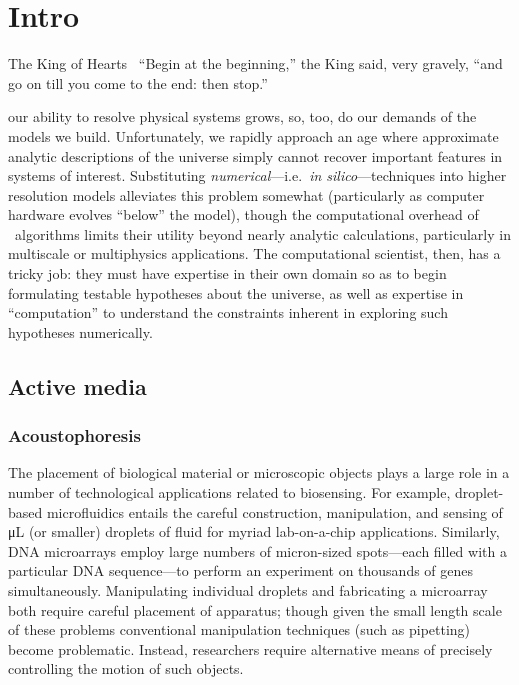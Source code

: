 \chapter{\label{ch:intro}Intro}

\begin{frontquote}{The King of Hearts~\cite{wonderland}}
``Begin at the beginning,'' the King said, very gravely, ``and go on till you come to the end: then stop.''
\end{frontquote}

 our ability to resolve physical systems grows, so, too, do our demands of the models we build.
Unfortunately, we rapidly approach an age where approximate analytic descriptions of the universe simply cannot recover important features in systems of interest.
Substituting \emph{numerical}---i.e.\ \emph{in silico}---techniques into higher resolution models alleviates this problem somewhat (particularly as computer hardware evolves ``below'' the model), though the computational overhead of \naive\ algorithms limits their utility beyond nearly analytic calculations, particularly in multiscale or multiphysics applications.
The computational scientist, then, has a tricky job: they must have expertise in their own domain so as to begin formulating testable hypotheses about the universe, as well as expertise in ``computation'' to understand the constraints inherent in exploring such hypotheses numerically.

\section{Active media}

\subsection{Acoustophoresis}

The placement of biological material or microscopic objects plays a large role in a number of technological applications related to biosensing.
For example, droplet-based microfluidics entails the careful construction, manipulation, and sensing of \si{\micro\liter} (or smaller) droplets of fluid for myriad lab-on-a-chip applications.
Similarly, DNA microarrays employ large numbers of micron-sized spots---each filled with a particular DNA sequence---to perform an experiment on thousands of genes simultaneously.
Manipulating individual droplets and fabricating a microarray both require careful placement of apparatus; though given the small length scale of these problems conventional manipulation techniques (such as pipetting) become problematic.
Instead, researchers require alternative means of precisely controlling the motion of such objects.

